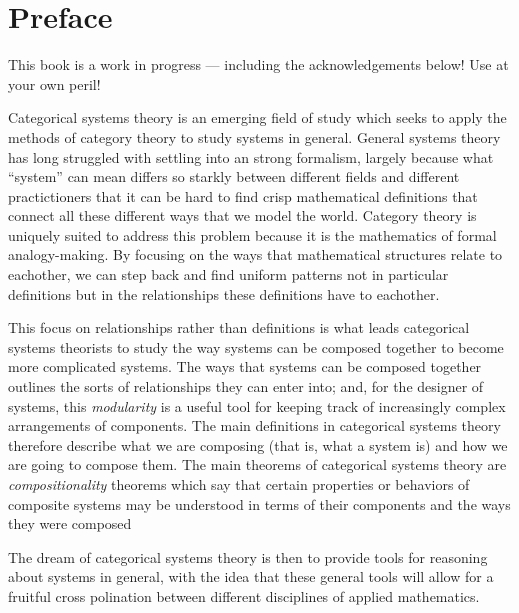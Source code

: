 \documentclass[DynamicalBook]{subfiles}
\begin{document}
%


\setcounter{chapter}{0}%


\chapter{Preface}\label{chapter.0}

This book is a work in progress --- including the acknowledgements below! Use at your own peril!


















Categorical systems theory is an emerging field of study which seeks to apply the methods of category theory to study systems in general. General systems theory has long struggled with settling into an strong formalism, largely because what ``system'' can mean differs so starkly between different fields and different practictioners that it can be hard to find crisp mathematical definitions that connect all these different ways that we model the world. Category theory is uniquely suited to address this problem because it is the mathematics of formal analogy-making. By focusing on the ways that mathematical structures relate to eachother, we can step back and find uniform patterns not in particular definitions but in the relationships these definitions have to eachother.

This focus on relationships rather than definitions is what leads categorical systems theorists to study the way systems can be composed together to become more complicated systems. The ways that systems can be composed together outlines the sorts of relationships they can enter into; and, for the designer of systems, this \emph{modularity} is a useful tool for keeping track of increasingly complex arrangements of components. The main definitions in categorical systems theory therefore describe what we are composing (that is, what a system is) and how we are going to compose them. The main theorems of categorical systems theory are \emph{compositionality} theorems which say that certain properties or behaviors of composite systems may be understood in terms of their components and the ways they were composed

The dream of categorical systems theory is then to provide tools for reasoning about systems in general, with the idea that these general tools will allow for a fruitful cross polination between different disciplines of applied mathematics.
\end{document}
